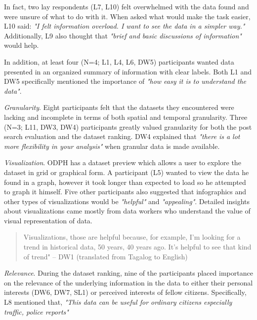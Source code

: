 \documentclass{sigchi}
\begin{document}
In fact, two lay respondents (L7, L10) felt overwhelmed with the data found and were unsure of what to do with it. When asked what would make the task easier, L10 said: \textit{"I felt information overload. I want to see the data in a simpler way."} Additionally, L9 also thought that \textit{"brief and basic discussions of information"} would help.

In addition, at least four (N=4; L1, L4, L6, DW5) participants wanted data presented in an organized summary of information with clear labels. Both L1 and DW5 specifically mentioned the importance of \textit{"how easy it is to understand the data"}.



\textit{Granularity}. Eight participants felt that the datasets they encountered were lacking and incomplete in terms of both spatial and temporal granularity. Three (N=3; L11, DW3, DW4) participants greatly valued granularity for both the post search evaluation and the dataset ranking. DW4 explained that \textit{"there is a lot more flexibility in your analysis"} when granular data is made available.

\textit{Visualization}. ODPH has a dataset preview which allows a user to explore the dataset in grid or graphical form. A participant (L5) wanted to view the data he found in a graph, however it took longer than expected to load so he attempted to graph it himself. Five other participants also suggested that infographics and other types of visualizations would be \textit{"helpful"} and \textit{"appealing"}. Detailed insights about visualizations came mostly from data workers who understand the value of visual representation of data. 
\begin{quote}
Visualizations, those are helpful because, for example, I'm looking for a trend in historical data, 50 years, 40 years ago. It's helpful to see that kind of trend" -- DW1 (translated from Tagalog to English)
\end{quote}

\textit{Relevance}. During the dataset ranking, nine of the participants placed importance on the relevance of the underlying information in the data to either their personal interests (DW6, DW7, SL1)  or perceived interests of fellow citizens. Specifically, L8 mentioned that, \textit{"This data can be useful for ordinary citizens especially traffic, police reports"}
\end{document}
